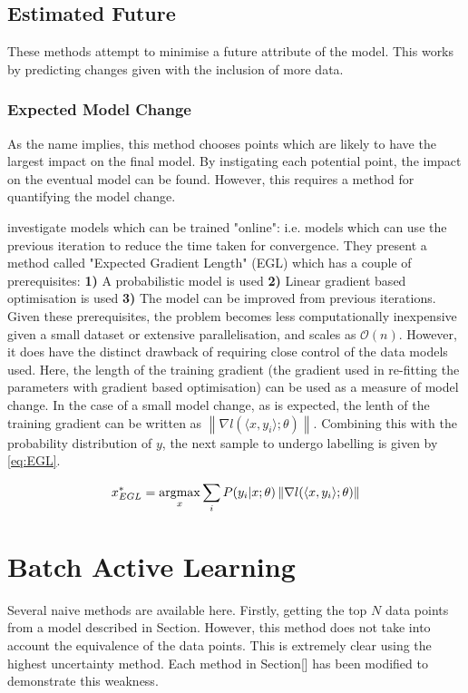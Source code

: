 \subsection{Estimated Future}
These methods attempt to minimise a future attribute of the model. This works by predicting changes given with the inclusion of more data.

\subsubsection{Expected Model Change}
As the name implies, this method chooses points which are likely to have the largest impact on the final model. By instigating each potential point, the impact on the eventual model can be found. However, this requires a method for quantifying the model change.

\textcite{Set08,Set09} investigate models which can be trained "online": i.e. models which can use the previous iteration to reduce the time taken for convergence. They present a method called "Expected Gradient Length" (EGL) which has a couple of prerequisites: \textbf{1)} A probabilistic model is used \textbf{2)} Linear gradient based optimisation is used \textbf{3)} The model can be improved from previous iterations. Given these prerequisites, the problem becomes less computationally inexpensive given a small dataset or extensive parallelisation, and scales as $\mathcal{O}(n)$. However, it does have the distinct drawback of requiring close control of the data models used. Here, the length of the training gradient (the gradient used in re-fitting the parameters with gradient based optimisation) can be used as a measure of model change. In the case of a small model change, as is expected, the lenth of the training gradient can be written as ${\left\|\nabla{}l(\langle{}x, y_i\rangle{};\theta{})\right\|}$. Combining this with the probability distribution of $y$, the next sample to undergo labelling is given by \ref{eq:EGL}.

\begin{equation}
  \label{eq:EGL}
  x_{EGL}^*=\operatorname*{argmax}_x{\sum_i{P(y_i|x;\theta{})\left\|\nabla{}l(\langle{}x, y_i\rangle{};\theta{})\right\|}}
\end{equation}


\section{Batch Active Learning}
Several naive methods are available here. Firstly, getting the top $N$ data points from a model described in Section. However, this method does not take into account the equivalence of the data points. This is extremely clear using the highest uncertainty method. Each method in Section[] has been modified to demonstrate this weakness.

